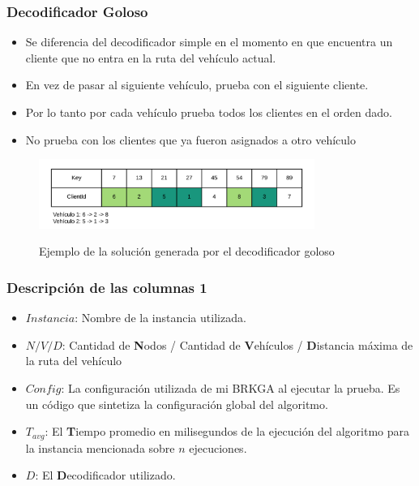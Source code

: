 \documentclass{beamer}
\begin{document}
\begin{frame}
\frametitle{Decodificador Goloso}

\begin{itemize}
    \item Se diferencia del decodificador simple en el momento en que encuentra un cliente que no entra en la ruta del vehículo actual.
    \pause
    \item En vez de pasar al siguiente vehículo, prueba con el siguiente cliente.
    \pause
    \item Por lo tanto por cada vehículo prueba todos los clientes en el orden dado.
    \pause
    \item No prueba con los clientes que ya fueron asignados a otro vehículo
    \pause
\end{itemize}

\begin{figure}[h]
	\caption{Ejemplo de la solución generada por el decodificador goloso}
	\centering
	\includegraphics[width=9cm]{DistribucionClientesDecoGoloso}
	\label{fig:DistribucionClientesDecoGoloso}
\end{figure}

\end{frame}


\begin{frame}
\frametitle{Descripción de las columnas 1}

\begin{itemize}
	\item \textbf{$Instancia$}: Nombre de la instancia utilizada.
	\item \textbf{$N/V/D$}: Cantidad de \textbf{N}odos / Cantidad de \textbf{V}ehículos / \textbf{D}istancia máxima de la ruta del vehículo
	\item \textbf{$Config$}: La configuración utilizada de mi BRKGA al ejecutar la prueba. Es un código que sintetiza la configuración global del algoritmo.
	\item \textbf{$T_{avg}$}: El \textbf{T}iempo promedio en milisegundos de la ejecución del algoritmo para la instancia mencionada sobre $n$ ejecuciones.
	\item \textbf{$D$}: El \textbf{D}ecodificador utilizado.
\end{itemize}

\end{frame}
\end{document}
